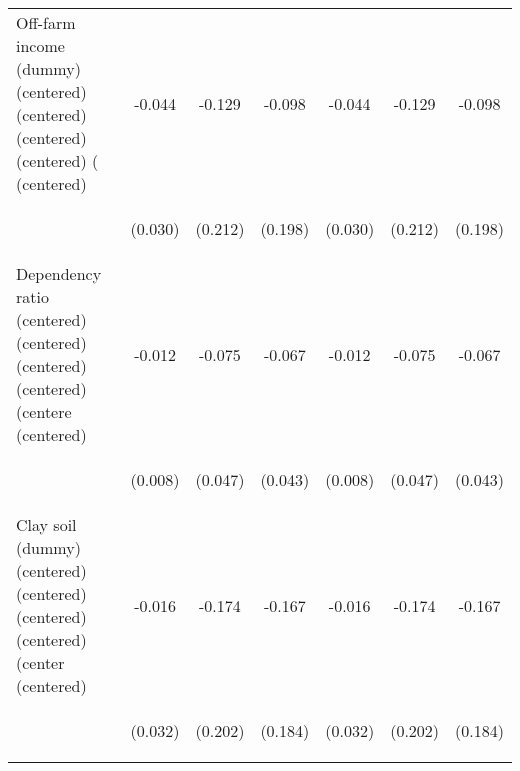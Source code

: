 \begin{center}
\begin{tabular}{lcccccc}
Off-farm income (dummy) (centered) (centered) (centered) (centered) ( (centered) & -0.044 & -0.129 & -0.098 & -0.044 & -0.129 & -0.098 \\
\vspace{4pt} & \begin{footnotesize}(0.030)\end{footnotesize} & \begin{footnotesize}(0.212)\end{footnotesize} & \begin{footnotesize}(0.198)\end{footnotesize} & \begin{footnotesize}(0.030)\end{footnotesize} & \begin{footnotesize}(0.212)\end{footnotesize} & \begin{footnotesize}(0.198)\end{footnotesize} \\
Dependency ratio (centered) (centered) (centered) (centered) (centere (centered) & -0.012 & -0.075 & -0.067 & -0.012 & -0.075 & -0.067 \\
\vspace{4pt} & \begin{footnotesize}(0.008)\end{footnotesize} & \begin{footnotesize}(0.047)\end{footnotesize} & \begin{footnotesize}(0.043)\end{footnotesize} & \begin{footnotesize}(0.008)\end{footnotesize} & \begin{footnotesize}(0.047)\end{footnotesize} & \begin{footnotesize}(0.043)\end{footnotesize} \\
Clay soil (dummy) (centered) (centered) (centered) (centered) (center (centered) & -0.016 & -0.174 & -0.167 & -0.016 & -0.174 & -0.167 \\
\vspace{4pt} & \begin{footnotesize}(0.032)\end{footnotesize} & \begin{footnotesize}(0.202)\end{footnotesize} & \begin{footnotesize}(0.184)\end{footnotesize} & \begin{footnotesize}(0.032)\end{footnotesize} & \begin{footnotesize}(0.202)\end{footnotesize} & \begin{footnotesize}(0.184)\end{footnotesize} \\

\end{tabular}
\end{center}
